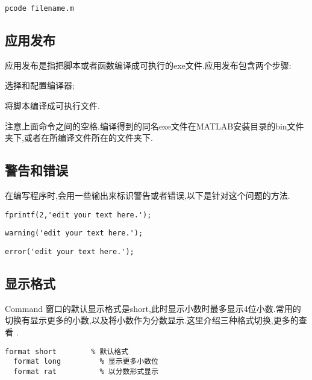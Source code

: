   \vspace{-0.8cm}
  \begin{lstlisting}[caption = 代码保护]
    pcode filename.m
  \end{lstlisting}




\subsection{应用发布}
 应用发布是指把脚本或者函数编译成可执行的exe文件.应用发布包含两个步骤:

 \begindot
  \item {} 选择和配置编译器;
  \item {} 将脚本编译成可执行文件.
 \myenddot

注意上面命令之间的空格.编译得到的同名exe文件在MATLAB安装目录的bin文件夹下,或者在所编译文件所在的文件夹下.



\subsection{警告和错误}
在编写程序时,会用一些输出来标识警告或者错误,以下是针对这个问题的方法.

\vspace{-0.8cm}
\begin{lstlisting}[caption = 红色字符串输出]
  fprintf(2,'edit your text here.');
\end{lstlisting}


\vspace{-0.8cm}
\begin{lstlisting}[caption = 警告输出]
  warning('edit your text here.');
\end{lstlisting}

\vspace{-0.8cm}
\begin{lstlisting}[caption = 错误输出]
  error('edit your text here.');
\end{lstlisting}



\subsection{显示格式}
Command 窗口的默认显示格式是short,此时显示小数时最多显示4位小数.常用的切换有显示更多的小数,以及将小数作为分数显示.这里介绍三种格式切换,更多的查看 .

\vspace{-0.8cm}
\begin{lstlisting}[caption = Command窗口显示格式]
  format short        % 默认格式
  format long         % 显示更多小数位
  format rat          % 以分数形式显示
\end{lstlisting}